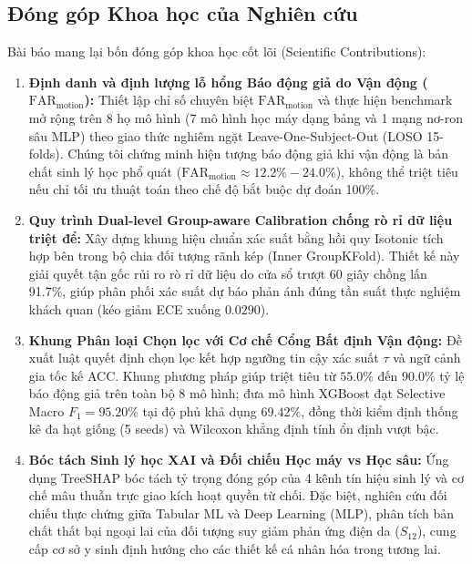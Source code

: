 \documentclass[conference]{IEEEtran}
\begin{document}
\subsection{Đóng góp Khoa học của Nghiên cứu}
Bài báo mang lại bốn đóng góp khoa học cốt lõi (Scientific Contributions):
\begin{enumerate}
    \item \textbf{Định danh và định lượng lỗ hổng Báo động giả do Vận động ($\text{FAR}_{\text{motion}}$):} Thiết lập chỉ số chuyên biệt $\text{FAR}_{\text{motion}}$ và thực hiện benchmark mở rộng trên 8 họ mô hình (7 mô hình học máy dạng bảng và 1 mạng nơ-ron sâu MLP) theo giao thức nghiêm ngặt Leave-One-Subject-Out (LOSO 15-folds). Chúng tôi chứng minh hiện tượng báo động giả khi vận động là bản chất sinh lý học phổ quát ($\text{FAR}_{\text{motion}} \approx 12.2\% - 24.0\%$), không thể triệt tiêu nếu chỉ tối ưu thuật toán theo chế độ bắt buộc dự đoán 100\%.
    \item \textbf{Quy trình Dual-level Group-aware Calibration chống rò rỉ dữ liệu triệt để:} Xây dựng khung hiệu chuẩn xác suất bằng hồi quy Isotonic tích hợp bên trong bộ chia đối tượng rãnh kép (Inner GroupKFold). Thiết kế này giải quyết tận gốc rủi ro rò rỉ dữ liệu do cửa sổ trượt 60 giây chồng lấn 91.7\%, giúp phân phối xác suất dự báo phản ánh đúng tần suất thực nghiệm khách quan (kéo giảm ECE xuống $0.0290$).
    \item \textbf{Khung Phân loại Chọn lọc với Cơ chế Cổng Bất định Vận động:} Đề xuất luật quyết định chọn lọc kết hợp ngưỡng tin cậy xác suất $\tau$ và ngữ cảnh gia tốc kế ACC. Khung phương pháp giúp triệt tiêu từ $55.0\%$ đến $90.0\%$ tỷ lệ báo động giả trên toàn bộ 8 mô hình; đưa mô hình XGBoost đạt Selective Macro $F_1 = 95.20\%$ tại độ phủ khả dụng $69.42\%$, đồng thời kiểm định thống kê đa hạt giống (5 seeds) và Wilcoxon khẳng định tính ổn định vượt bậc.
    \item \textbf{Bóc tách Sinh lý học XAI và Đối chiếu Học máy vs Học sâu:} Ứng dụng TreeSHAP bóc tách tỷ trọng đóng góp của 4 kênh tín hiệu sinh lý và cơ chế mâu thuẫn trực giao kích hoạt quyền từ chối. Đặc biệt, nghiên cứu đối chiếu thực chứng giữa Tabular ML và Deep Learning (MLP), phân tích bản chất thất bại ngoại lai của đối tượng suy giảm phản ứng điện da ($S_{12}$), cung cấp cơ sở y sinh định hướng cho các thiết kế cá nhân hóa trong tương lai.
\end{enumerate}

\end{document}
